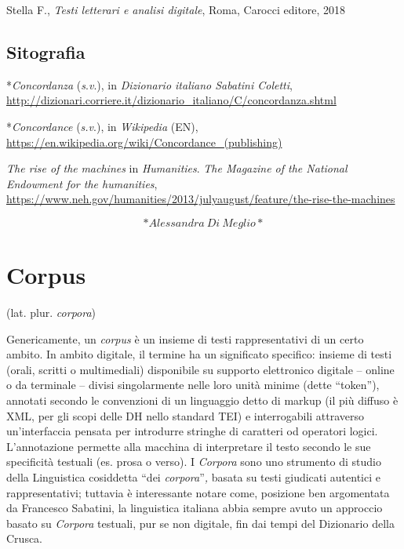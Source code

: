 \documentclass[
  b5paper,
  twoside,
  12pt,
  chapterprefix=false,
  bibliography=totocnumbered,
  parskip=false]{scrbook}
\begin{document}
Stella F., \emph{Testi letterari e analisi digitale}, Roma, Carocci editore,
2018

\hypertarget{sitografia-4}{%
\section*{Sitografia}\label{sitografia-4}}

*\emph{Concordanza} (\emph{s}.\emph{v}.), in \emph{Dizionario italiano Sabatini Coletti},
\url{http://dizionari.corriere.it/dizionario_italiano/C/concordanza.shtml}

*\emph{Concordance} (\emph{s.v}.), in \emph{Wikipedia} (EN),
\url{https://en.wikipedia.org/wiki/Concordance_(publishing)}

\emph{The rise of the} \emph{machines} in \emph{Humanities}. \emph{The Magazine of the
National Endowment for the humanities},
\url{https://www.neh.gov/humanities/2013/julyaugust/feature/the-rise-the-machines}

\[*Alessandra~Di~Meglio*\]

\hypertarget{corpus}{%
\chapter{Corpus}\label{corpus}}

(lat. plur. \emph{corpora})

Genericamente, un \emph{corpus} è un insieme di testi rappresentativi di un
certo ambito. In ambito digitale, il termine ha un significato
specifico: insieme di testi (orali, scritti o multimediali) disponibile
su supporto elettronico digitale -- online o da terminale -- divisi
singolarmente nelle loro unità minime (dette \enquote{token}), annotati secondo
le convenzioni di un linguaggio detto di markup (il più diffuso è XML,
per gli scopi delle DH nello standard TEI) e interrogabili attraverso
un'interfaccia pensata per introdurre stringhe di caratteri od operatori
logici. L'annotazione permette alla macchina di interpretare il testo
secondo le sue specificità testuali (es. prosa o verso). I \emph{Corpora}
sono uno strumento di studio della Linguistica cosiddetta \enquote{dei
\emph{corpora}}\emph{,} basata su testi giudicati autentici e rappresentativi;
tuttavia è interessante notare come, posizione ben argomentata da
Francesco Sabatini, la linguistica italiana abbia sempre avuto un
approccio basato su \emph{Corpora} testuali, pur se non digitale, fin dai
tempi del Dizionario della Crusca.
\end{document}
